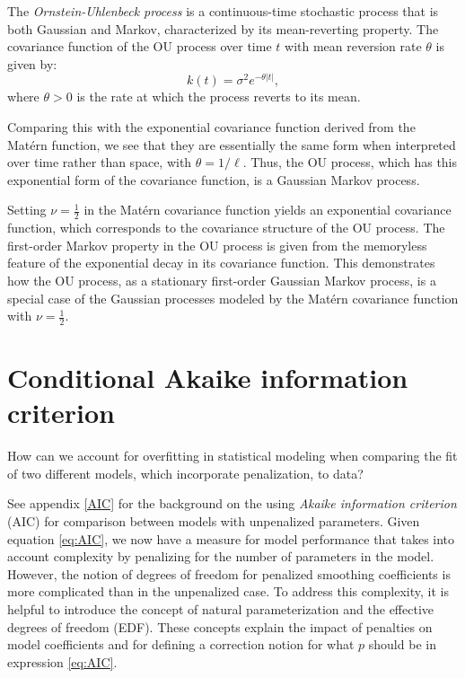\documentclass[
11pt, %
oneside, %
english, %
singlespacing, %
]{macthesis} %
\begin{document}
The \emph{Ornstein-Uhlenbeck process} is a continuous-time stochastic process that is both Gaussian and Markov, characterized by its mean-reverting property. The covariance function of the OU process over time \(t\) with mean reversion rate \(\theta\) is given by:
\[
k(t) = \sigma^2 e^{-\theta |t|},
\]
where \(\theta > 0\) is the rate at which the process reverts to its mean.

Comparing this with the exponential covariance function derived from the Matérn function, we see that they are essentially the same form when interpreted over time rather than space, with \(\theta = 1/\ell\). Thus, the OU process, which has this exponential form of the covariance function, is a Gaussian Markov process.

Setting \(\nu = \frac{1}{2}\) in the Matérn covariance function yields an exponential covariance function, which corresponds to the covariance structure of the OU process. The first-order Markov property in the OU process is given from the memoryless feature of the exponential decay in its covariance function. This demonstrates how the OU process, as a stationary first-order Gaussian Markov process, is a special case of the Gaussian processes modeled by the Matérn covariance function with \(\nu = \frac{1}{2}\).

\section{Conditional Akaike information criterion}\label{conditional-akaike-information-criterion}

How can we account for overfitting in statistical modeling when comparing the fit of two different models, which incorporate penalization, to data?

See appendix \ref{AIC} for the background on the using \emph{Akaike information criterion} (AIC) for comparison between models with unpenalized parameters. Given equation \ref{eq:AIC}, we now have a measure for model performance that takes into account complexity by penalizing for the number of parameters in the model. However, the notion of degrees of freedom for penalized smoothing coefficients is more complicated than in the unpenalized case. To address this complexity, it is helpful to introduce the concept of natural parameterization and the effective degrees of freedom (EDF). These concepts explain the impact of penalties on model coefficients and for defining a correction notion for what \(p\) should be in expression \ref{eq:AIC}.
\end{document}
